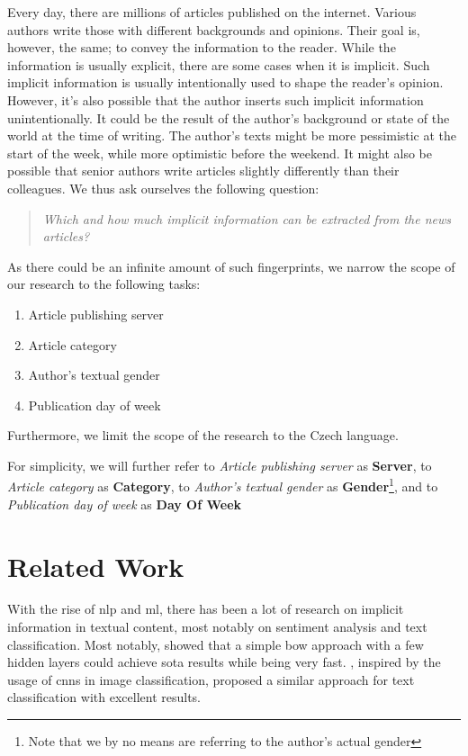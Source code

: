 Every day, there are millions of articles published on the internet. Various authors write those
with different backgrounds and opinions. Their goal is, however, the same; to convey the information to the reader.
While the information is usually explicit, there are some cases when it is implicit. Such implicit information 
is usually intentionally used to shape the reader's opinion. However, it's also possible
that the author inserts such implicit information unintentionally. It could
be the result of the author's background or state of the world at the time of writing.
The author's texts might be more pessimistic at the start of the week, while more optimistic before the weekend.
It might also be possible that senior authors write articles slightly differently than their colleagues.
We thus ask ourselves the following question:
\begin{quote}
    \textit{Which and how much implicit information can be extracted from the news articles?}
\end{quote}

As there could be an infinite amount of such fingerprints, we narrow the scope of our research to the following tasks:
\begin{enumerate}
    \item Article publishing server
    \item Article category
    \item Author's textual gender
    \item Publication day of week
\end{enumerate}
Furthermore, we limit the scope of the research to the Czech language.

For simplicity, we will further refer
to \textit{Article publishing server} as \textbf{Server},
to \textit{Article category} as \textbf{Category},
to \textit{Author's textual gender} as \textbf{Gender}\footnote{Note that we by no means are referring to the author's actual gender},
and to \textit{Publication day of week} as \textbf{Day Of Week}


\section*{Related Work}
With the rise of \ac{nlp} and \ac{ml},
there has been a lot of research on implicit information in textual content, most notably on sentiment analysis
and text classification. Most notably, \textcite{joulinBagTricksEfficient2016} showed that a simple \acl{bow} approach
with a few hidden layers could achieve \ac{sota} results while being very fast.
\textcite{zhangTextUnderstandingScratch2016}, inspired by the usage of \acp{cnn} in image classification,
proposed a similar approach for text classification with excellent results.

